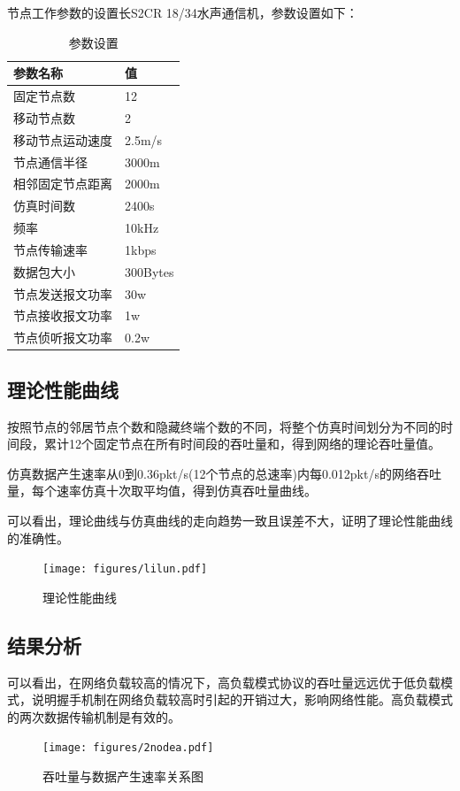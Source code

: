 节点工作参数的设置长S2CR 18/34水声通信机，参数设置如下：
\renewcommand{\arraystretch}{1.2}
\begin{table}[!htp]
	\centering
\caption{参数设置}
\begin{tabular}{m{5cm}<{\centering} m{5cm}<{\centering}}%
	\hline  %
    参数名称& 值\\
	\hline  
	固定节点数& 12\\
	移动节点数& 2\\
	移动节点运动速度& 2.5m/s\\
	节点通信半径& 3000m\\
	相邻固定节点距离& 2000m\\
	仿真时间数& 2400s\\
	频率& 10kHz\\			
	节点传输速率& 1kbps\\
	数据包大小& 300Bytes\\
	节点发送报文功率& 30w\\				
	节点接收报文功率& 1w\\
	节点侦听报文功率& 0.2w\\
	\hline 		
\end{tabular}
\label{tab2}
\end{table}

\subsection{理论性能曲线}
按照节点的邻居节点个数和隐藏终端个数的不同，将整个仿真时间划分为不同的时间段，累计12个固定节点在所有时间段的吞吐量和，得到网络的理论吞吐量值。

仿真数据产生速率从0到0.36pkt/s(12个节点的总速率)内每0.012pkt/s的网络吞吐量，每个速率仿真十次取平均值，得到仿真吞吐量曲线。

可以看出，理论曲线与仿真曲线的走向趋势一致且误差不大，证明了理论性能曲线的准确性。
\begin{figure}[!ht]
	\centering
	\texttt{[image: figures/lilun.pdf]}
	\caption{
		理论性能曲线
	}
	\label{fig:example}
\end{figure}

\subsection{结果分析}
可以看出，在网络负载较高的情况下，高负载模式协议的吞吐量远远优于低负载模式，说明握手机制在网络负载较高时引起的开销过大，影响网络性能。高负载模式的两次数据传输机制是有效的。
\begin{figure}[!ht]
	\centering
	\texttt{[image: figures/2nodea.pdf]}
	\caption{
		吞吐量与数据产生速率关系图
	}
	\label{fig:example}
\end{figure}

